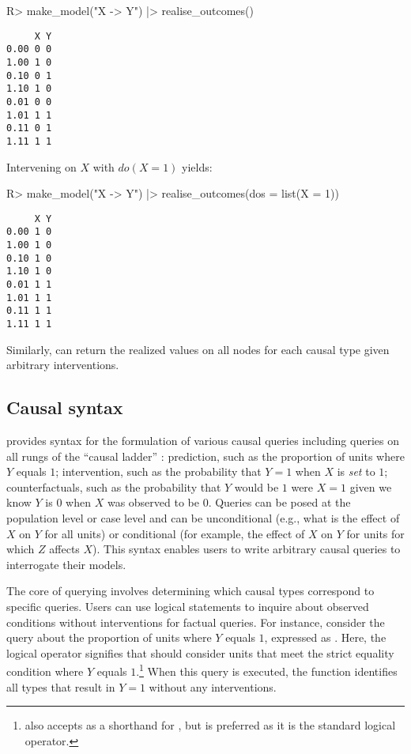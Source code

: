 \documentclass[
  11pt,
  article]{jss}
\renewcommand{\texttt}[1]{\code{#1}}
\begin{document}
\begin{CodeInput}
R> make_model("X -> Y") |> realise_outcomes()
\end{CodeInput}

\begin{verbatim}
     X Y
0.00 0 0
1.00 1 0
0.10 0 1
1.10 1 0
0.01 0 0
1.01 1 1
0.11 0 1
1.11 1 1
\end{verbatim}

Intervening on \(X\) \citep[see][]{pearl_causality_2009} with
\(do(X=1)\) yields:

\begin{CodeInput}
R> make_model("X -> Y") |> realise_outcomes(dos = list(X = 1))
\end{CodeInput}

\begin{verbatim}
     X Y
0.00 1 0
1.00 1 0
0.10 1 0
1.10 1 0
0.01 1 1
1.01 1 1
0.11 1 1
1.11 1 1
\end{verbatim}

Similarly, \texttt{realise\_outcomes()} can return the realized values
on all nodes for each causal type given arbitrary interventions.

\subsection{Causal syntax}\label{sec-syntax}

 provides syntax for the formulation of various
causal queries including queries on all rungs of the ``causal ladder''
\citep{pearl_causality_2009}: prediction, such as the proportion of
units where \(Y\) equals \(1\); intervention, such as the probability
that \(Y = 1\) when \(X\) is \emph{set} to \(1\); counterfactuals, such
as the probability that \(Y\) would be \(1\) were \(X = 1\) given we
know \(Y\) is \(0\) when \(X\) was observed to be \(0\). Queries can be
posed at the population level or case level and can be unconditional
(e.g., what is the effect of \(X\) on \(Y\) for all units) or
conditional (for example, the effect of \(X\) on \(Y\) for units for
which \(Z\) affects \(X\)). This syntax enables users to write arbitrary
causal queries to interrogate their models.

The core of querying involves determining which causal types correspond
to specific queries. Users can use logical statements to inquire about
observed conditions without interventions for factual queries. For
instance, consider the query about the proportion of units where \(Y\)
equals \(1\), expressed as \texttt{"Y\ ==\ 1"}. Here, the logical
operator \texttt{==} signifies that  should consider
units that meet the strict equality condition where \(Y\) equals
\(1\).\footnote{ also accepts \texttt{=} as a
  shorthand for \texttt{==}, but \texttt{==} is preferred as it is the
  standard logical operator.} When this query is executed, the
\texttt{get\_query\_types()} function identifies all types that result
in \(Y=1\) without any interventions.
\end{document}
